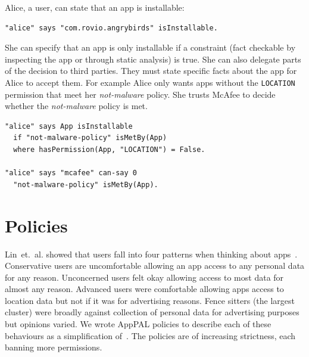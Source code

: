 \documentclass[]{soups-poster}
\newcommand{\etal}[0]{et{.}~al{.}}
\newcommand{\citep}[1]{\cite{#1}}
\begin{document}
Alice, a user, can state that an app is installable:
\begin{lstlisting}
"alice" says "com.rovio.angrybirds" isInstallable.
\end{lstlisting}
She can specify that an app is only installable if a constraint (fact checkable by inspecting the app or through static analysis) is true.
She can also delegate parts of the decision to third parties.
They must state specific facts about the app for Alice to accept them.
For example Alice only wants apps without the \texttt{LOCATION} permission that meet her \emph{not-malware} policy.
She trusts McAfee to decide whether the \emph{not-malware} policy is met.
\begin{lstlisting}
"alice" says App isInstallable
  if "not-malware-policy" isMetBy(App)
  where hasPermission(App, "LOCATION") = False.

"alice" says "mcafee" can-say 0
  "not-malware-policy" isMetBy(App).
\end{lstlisting}

\section{Policies}

Lin~\etal{} showed that users fall into four patterns when thinking about apps~\citep{Sadeh:2014vq}.  
Conservative users are uncomfortable allowing an app access to any personal data for any reason.
Unconcerned users felt okay allowing access to most data for almost any reason.  
Advanced users were comfortable allowing apps access to location data but not if it was for advertising reasons.
Fence sitters (the largest cluster) were broadly against collection of personal data for advertising purposes but opinions varied.
We wrote AppPAL policies to describe each of these behaviours as a simplification of~\citep{Sadeh:2014vq}.
The policies are of increasing strictness, each banning more permissions.
\end{document}
